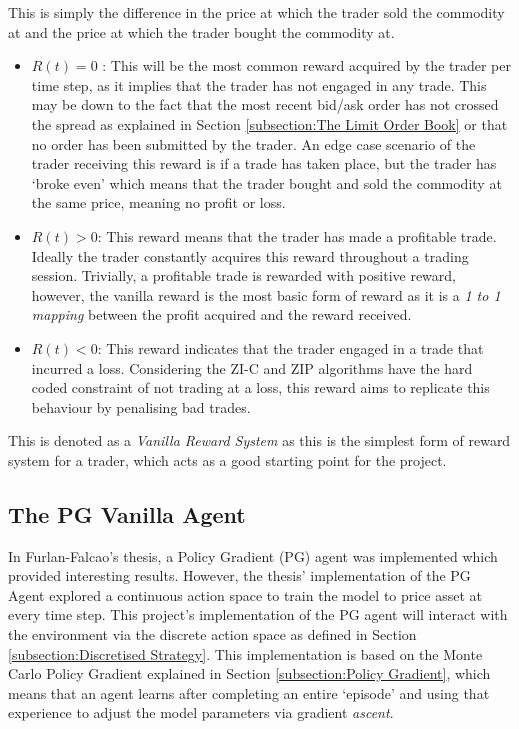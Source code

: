 \documentclass[ %
                    author={Ashwinder Khurana},
                supervisor={Prof Dave Cliff},
                    degree={MEng},
                     title={The Deeply Reinforced Trader},
                  subtitle={},
                      type={enterprise},
                      year={2020} ]{dissertation}
\begin{document}
{\noindent
This is simply the difference in the price at which the trader sold the commodity at and the price at which the trader bought the commodity at. 

\begin{itemize}
\item $R(t) = 0$ : This will be the most common reward acquired by the trader per time step, as it implies that the trader has not engaged in any trade. This may be down to the fact that the most recent bid/ask order has not crossed the spread as explained in Section \ref{subsection:The Limit Order Book} or that no order has been submitted by the trader. An edge case scenario of the trader receiving this reward is if a trade has taken place, but the trader has \enquote*{broke even} which means that the trader bought and sold the commodity at the same price, meaning no profit or loss.
\item $R(t) > 0$: This reward means that the trader has made a profitable trade. Ideally the trader constantly acquires this reward throughout a trading session. Trivially, a profitable trade is rewarded with positive reward, however, the vanilla reward is the most basic form of reward as it is a \textit{1 to 1 mapping} between the profit acquired and the reward received. 
\item $R(t) < 0$: This reward indicates that the trader engaged in a trade that incurred a loss. Considering the ZI-C and ZIP algorithms have the hard coded constraint of not trading at a loss, this reward aims to replicate this behaviour by penalising bad trades.
\end{itemize}

\noindent
This is denoted as a \textit{Vanilla Reward System} as this is the simplest form of reward system for a trader, which acts as a good starting point for the project. 

\subsection{The PG Vanilla Agent}
In Furlan-Falcao's thesis, a Policy Gradient (PG) agent was implemented which provided interesting results. However, the thesis' implementation of the PG Agent explored a continuous action space to train the model to price asset at every time step. This project's implementation of the PG agent will interact with the environment via the discrete action space as defined in Section \ref{subsection:Discretised Strategy}. This implementation is based on the Monte Carlo Policy Gradient explained in Section \ref{subsection:Policy Gradient}, which means that an agent learns after completing an entire \enquote*{episode} and using that experience to adjust the model parameters via gradient \textit{ascent}.
 
}
\end{document}
